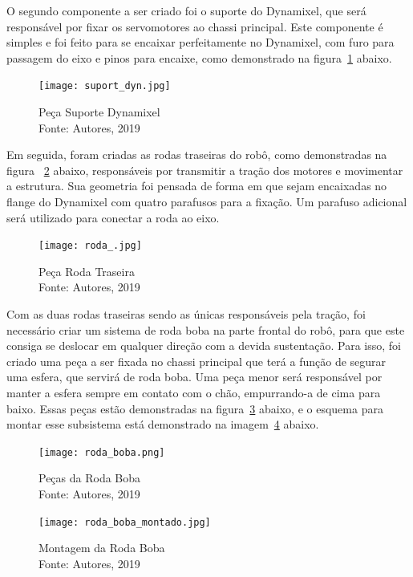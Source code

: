 O segundo componente a ser criado foi o suporte do Dynamixel, que será responsável por fixar os servomotores ao chassi principal. Este componente é simples e foi feito para se encaixar perfeitamente no Dynamixel, com furo para passagem do eixo e pinos
para encaixe, como demonstrado na figura~\ref{fig:suport_dyn} abaixo.

\begin{figure}[h!]
	\centering
	\texttt{[image: suport\_dyn.jpg]}\\
	\caption{Peça Suporte Dynamixel \\ Fonte: Autores, 2019}
	\label{fig:suport_dyn}
\end{figure}

Em seguida, foram criadas as rodas traseiras do robô, como demonstradas na figura ~\ref{fig:roda_} abaixo, responsáveis por transmitir a tração dos motores e movimentar a estrutura. Sua geometria foi pensada de forma em que sejam encaixadas no flange do Dynamixel com quatro parafusos para a fixação. Um parafuso adicional será utilizado para conectar a roda ao eixo.

\begin{figure}[h!]
	\centering
	\texttt{[image: roda\_.jpg]}\\
	\caption{Peça Roda Traseira \\ Fonte: Autores, 2019}
	\label{fig:roda_}
\end{figure}

Com as duas rodas traseiras sendo as únicas responsáveis pela tração, foi necessário criar um sistema de roda boba na parte frontal do robô, para que este consiga se deslocar em qualquer direção com a devida sustentação. Para isso, foi criado uma peça
 a ser fixada no chassi principal que terá a função de segurar uma esfera, que servirá de roda boba. Uma peça menor será responsável por manter a esfera sempre em contato com o chão, empurrando-a de cima para baixo. Essas peças estão demonstradas na figura~\ref{fig:roda_boba} abaixo, e o esquema para montar esse subsistema está demonstrado na imagem~\ref{fig:roda_boba_montado} abaixo.

\begin{figure}[h!]
	\centering
	\texttt{[image: roda\_boba.png]}\\
	\caption{Peças da Roda Boba \\ Fonte: Autores, 2019}
	\label{fig:roda_boba}
\end{figure}

\begin{figure}[h!]
	\centering
	\texttt{[image: roda\_boba\_montado.jpg]}\\
	\caption{Montagem da Roda Boba \\ Fonte: Autores, 2019}
	\label{fig:roda_boba_montado}
\end{figure}


